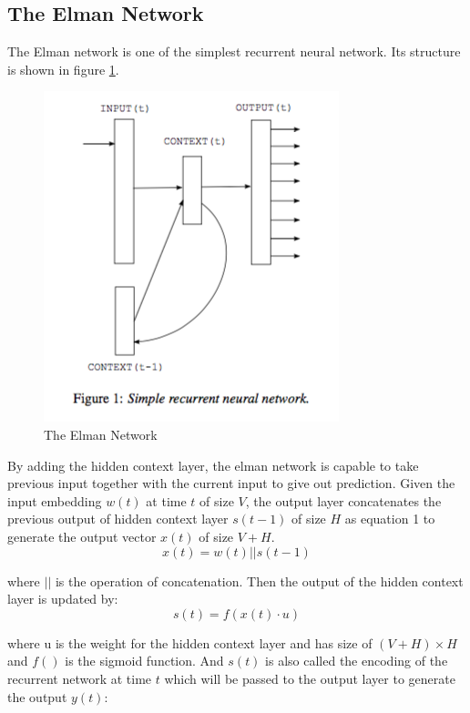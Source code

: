 \documentclass[]{article}
\begin{document}
\subsection{The Elman Network}
The Elman network is one of the simplest recurrent neural network\cite{elman1990finding}. 
Its structure is shown in figure \ref{elman}.
\begin{figure}
	\includegraphics[scale=0.8]{elman.png}
	\caption{The Elman Network\cite{mikolov2010recurrent}}
	\label{elman}
\end{figure}

By adding the hidden context layer, the elman network is capable to take previous input together with the current input to give out prediction. 
Given the input embedding $w(t)$ at time $t$ of size $V$, the output layer concatenates the previous output of hidden context layer $s(t-1)$ of size $H$ as equation 1 to generate the output vector $x(t)$  of size $V+H$.
\begin{equation}
	x(t) = w(t)||s(t-1)
\end{equation}

where $||$ is the operation of concatenation. 
Then the output of the hidden context layer is updated by:
\begin{equation}
	s(t) = f(x(t)  \cdot u)
\end{equation}

where u is the weight for the hidden context layer and has size of $(V+H) \times H$ and $f()$ is the sigmoid function.
And $s(t)$ is also called the encoding of the recurrent network at time $t$ which will be passed to the output layer to generate the output $y(t)$:
\end{document}
